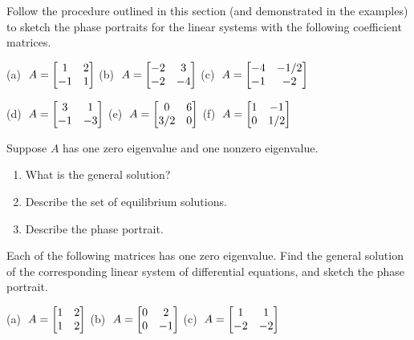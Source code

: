 \begin{exercises}
\begin{exercise}
Follow the procedure outlined in this section (and demonstrated
in the examples) to sketch the phase portraits for the linear
systems with the following coefficient matrices.

\smallskip
(a) $\displaystyle \; A = \begin{bmatrix} 1 & 2 \\ -1 & 1 \end{bmatrix}$
\hspace{1cm}
(b) $\displaystyle \; A = \begin{bmatrix} -2 & 3 \\ -2 & -4 \end{bmatrix}$
\hspace{1cm}
(c) $\displaystyle \; A = \begin{bmatrix} -4 & -1/2 \\ -1 & -2 \end{bmatrix}$ 

\smallskip
(d) $\displaystyle \; A = \begin{bmatrix} 3 & 1 \\ -1 & -3 \end{bmatrix}$ 
\hspace{0.75cm}
(e) $\displaystyle \; A = \begin{bmatrix} 0 & 6 \\ 3/2 & 0 \end{bmatrix}$
\hspace{1.2cm}
(f) $\displaystyle \; A = \begin{bmatrix} 1 & -1 \\ 0 & 1/2 \end{bmatrix}$ 
\end{exercise}
\begin{exercise}
Suppose $A$ has one zero eigenvalue and one nonzero eigenvalue.
\begin{enumerate}
\item[(a)] What is the general solution?
\item[(b)] Describe the set of equilibrium solutions.
\item[(c)] Describe the phase portrait.
\end{enumerate}
\end{exercise}
\begin{exercise}
Each of the following matrices has one zero eigenvalue.
Find the general solution of the corresponding linear system of
differential equations, and sketch the phase portrait.

\smallskip
(a) $\displaystyle \; A = \begin{bmatrix} 1 & 2 \\ 1 & 2 \end{bmatrix}$
\hspace{1cm}
(b) $\displaystyle \; A = \begin{bmatrix} 0 & 2 \\ 0 & -1 \end{bmatrix}$
\hspace{1cm}
(c) $\displaystyle \; A = \begin{bmatrix} 1 & 1 \\ -2 & -2 \end{bmatrix}$
\end{exercise}
\end{exercises}
%
\newpage
%

